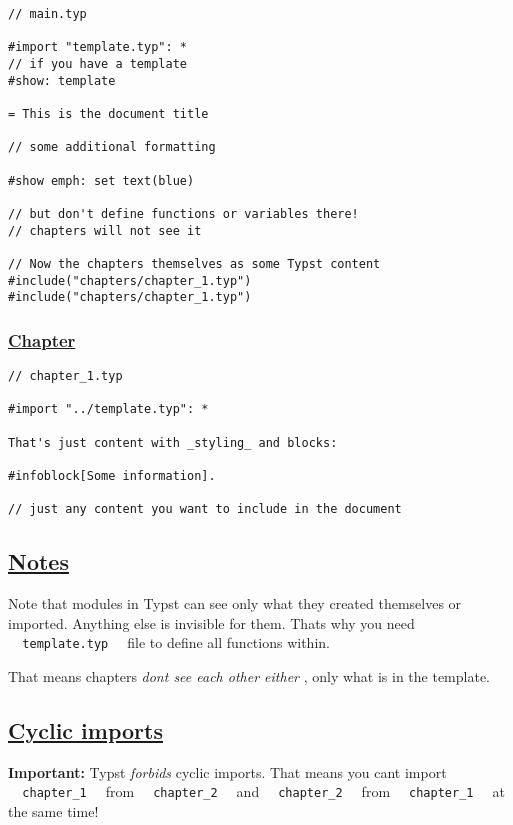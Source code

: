 \begin{verbatim}
// main.typ

#import "template.typ": *
// if you have a template
#show: template

= This is the document title

// some additional formatting

#show emph: set text(blue)

// but don't define functions or variables there!
// chapters will not see it

// Now the chapters themselves as some Typst content
#include("chapters/chapter_1.typ")
#include("chapters/chapter_1.typ")
\end{verbatim}

\subsubsection{\texorpdfstring{\hyperref[chapter]{Chapter}}{Chapter}}\label{chapter}

\begin{verbatim}
// chapter_1.typ

#import "../template.typ": *

That's just content with _styling_ and blocks:

#infoblock[Some information].

// just any content you want to include in the document
\end{verbatim}

\subsection{\texorpdfstring{\hyperref[notes]{Notes}}{Notes}}\label{notes}

Note that modules in Typst can see only what they created themselves or
imported. Anything else is invisible for them. That\textquotesingle s
why you need \texttt{\ }{\texttt{\ template.typ\ }}\texttt{\ } file to
define all functions within.

That means chapters \emph{don\textquotesingle t see each other either} ,
only what is in the template.

\subsection{\texorpdfstring{\hyperref[cyclic-imports]{Cyclic
imports}}{Cyclic imports}}\label{cyclic-imports}

\textbf{Important:} Typst \emph{forbids} cyclic imports. That means you
can\textquotesingle t import
\texttt{\ }{\texttt{\ chapter\_1\ }}\texttt{\ } from
\texttt{\ }{\texttt{\ chapter\_2\ }}\texttt{\ } and
\texttt{\ }{\texttt{\ chapter\_2\ }}\texttt{\ } from
\texttt{\ }{\texttt{\ chapter\_1\ }}\texttt{\ } at the same time!

